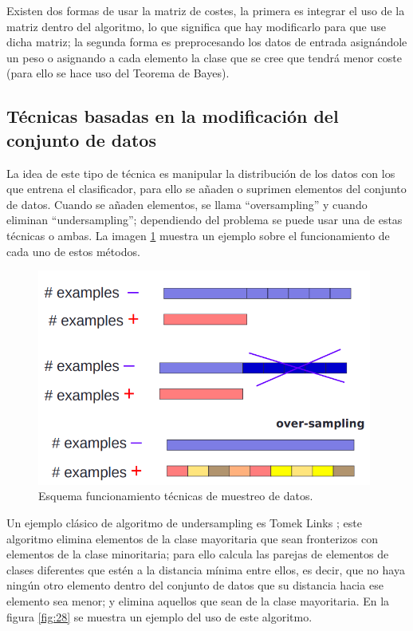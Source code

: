 Existen dos formas de usar la matriz de costes, la primera es integrar el uso de la matriz dentro del algoritmo, lo que significa que hay modificarlo para que use dicha matriz; la segunda forma es preprocesando los datos de entrada asignándole un peso o asignando a cada elemento la clase que se cree que tendrá menor coste (para ello se hace uso del Teorema de Bayes).

\subsection{Técnicas basadas en la modificación del conjunto de datos}
La idea de este tipo de técnica es manipular la distribución de los datos con los que entrena el clasificador, para ello se añaden o suprimen elementos del conjunto de datos. Cuando se añaden elementos, se llama “oversampling” y cuando eliminan “undersampling”; dependiendo del problema se puede usar una de estas técnicas o ambas. La imagen \ref{fig:27} muestra un ejemplo sobre el funcionamiento de cada uno de estos métodos.\newline
\newpage
\begin{figure}[H]
	\centering
	\includegraphics[width=110mm]{imagenes/oversampling_undersampling.png}
	\caption{Esquema funcionamiento técnicas de muestreo de datos.}
	\label{fig:27}
\end{figure}
\verticalspace

Un ejemplo clásico de algoritmo de undersampling es Tomek Links \cite{tomek1976two}; este algoritmo elimina elementos de la clase mayoritaria que sean fronterizos con elementos de la clase minoritaria; para ello calcula las parejas de elementos de clases diferentes que estén a la distancia mínima entre ellos, es decir, que no haya ningún otro elemento dentro del conjunto de datos que su distancia hacia ese elemento sea menor; y elimina aquellos que sean de la clase mayoritaria. En la figura \ref{fig:28} se muestra un ejemplo del uso de este algoritmo.\newline


